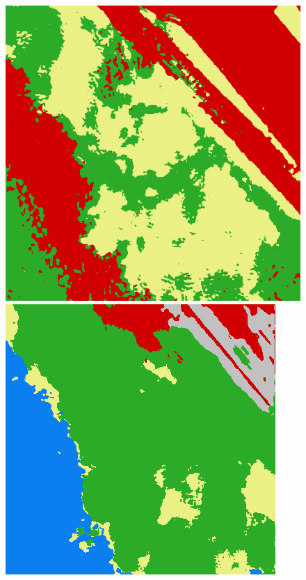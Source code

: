 \begin{figure}
    \includegraphics[width=\UnetPredictionsImageWidth]{images/unet/unet-18D/147352-prediction} \hfill
    \includegraphics[width=\UnetPredictionsImageWidth]{images/unet/unet-23/147352-prediction} \hfill

\end{figure}
